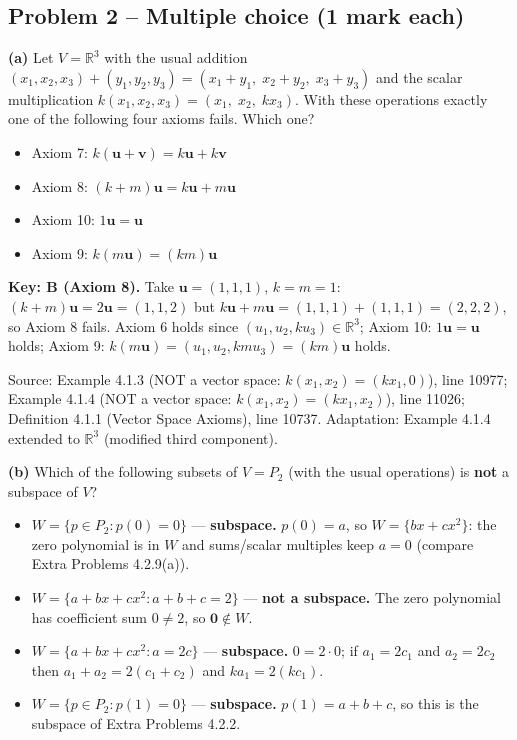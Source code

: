 \documentclass[11pt,a4paper]{article}
\newcommand{\Src}[1]{{\footnotesize\color{black!65}Source: #1}}
\begin{document}
\subsection*{Problem 2 -- Multiple choice (1 mark each)}
\textbf{(a)} Let $V=\mathbb{R}^3$ with the usual addition $(x_1,x_2,x_3)+(y_1,y_2,y_3)=(x_1+y_1,\;x_2+y_2,\;x_3+y_3)$ and the scalar multiplication $k(x_1,x_2,x_3)=(x_1,\;x_2,\;kx_3)$. With these operations exactly one of the following four axioms fails. Which one?\par
\begin{itemize}[leftmargin=8mm,itemsep=0pt]\item[A] Axiom 7: $k(\mathbf{u}+\mathbf{v})=k\mathbf{u}+k\mathbf{v}$\item[B$^{\ast}$] Axiom 8: $(k+m)\mathbf{u}=k\mathbf{u}+m\mathbf{u}$\item[C] Axiom 10: $1\mathbf{u}=\mathbf{u}$\item[D] Axiom 9: $k(m\mathbf{u})=(km)\mathbf{u}$\end{itemize}
\textbf{Key: B (Axiom 8).} Take $\mathbf{u}=(1,1,1)$, $k=m=1$: $(k+m)\mathbf{u}=2\mathbf{u}=(1,1,2)$ but $k\mathbf{u}+m\mathbf{u}=(1,1,1)+(1,1,1)=(2,2,2)$, so Axiom 8 fails. Axiom 6 holds since $(u_1,u_2,ku_3)\in\mathbb{R}^3$; Axiom 10: $1\mathbf{u}=\mathbf{u}$ holds; Axiom 9: $k(m\mathbf{u})=(u_1,u_2,kmu_3)=(km)\mathbf{u}$ holds.\par
\Src{Example 4.1.3 (NOT a vector space: $k(x_1,x_2)=(kx_1,0)$), line 10977; Example 4.1.4 (NOT a vector space: $k(x_1,x_2)=(kx_1,x_2)$), line 11026; Definition 4.1.1 (Vector Space Axioms), line 10737. Adaptation: Example 4.1.4 extended to $\mathbb{R}^3$ (modified third component).}\par
{}\textbf{(b)} Which of the following subsets of $V=P_2$ (with the usual operations) is \textbf{not} a subspace of $V$?\par
\begin{itemize}[leftmargin=8mm,itemsep=0pt]\item[A] $W=\{p\in P_2 : p(0)=0\}$ --- \textbf{subspace.} $p(0)=a$, so $W=\{bx+cx^2\}$: the zero polynomial is in $W$ and sums/scalar multiples keep $a=0$ (compare Extra Problems 4.2.9(a)).\item[B$^{\ast}$] $W=\{a+bx+cx^2 : a+b+c=2\}$ --- \textbf{not a subspace.} The zero polynomial has coefficient sum $0\neq2$, so $\mathbf{0}\notin W$.\item[C] $W=\{a+bx+cx^2 : a=2c\}$ --- \textbf{subspace.} $0=2\cdot0$; if $a_1=2c_1$ and $a_2=2c_2$ then $a_1+a_2=2(c_1+c_2)$ and $ka_1=2(kc_1)$.\item[D] $W=\{p\in P_2 : p(1)=0\}$ --- \textbf{subspace.} $p(1)=a+b+c$, so this is the subspace of Extra Problems 4.2.2.\end{itemize}
\end{document}

